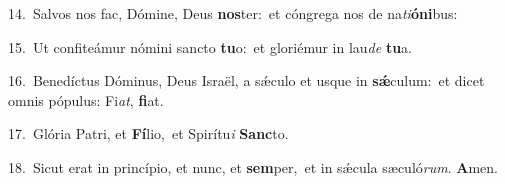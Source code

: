 {\numbfont\textcolor{\numbcolor}{14.}}~Salvos nos fac, Dómine, Deus \textbf{nos}\-ter:~\star et cóngrega nos de na\-\textit{ti}\-\textbf{ó}\textbf{ni}bus:\par
{\numbfont\textcolor{\numbcolor}{15.}}~Ut confiteámur nómini sancto \textbf{tu}\-o:~\star et gloriémur in lau\textit{de} \textbf{tu}\-a.\par
{\numbfont\textcolor{\numbcolor}{16.}}~Benedíctus Dóminus, Deus Israël, a sǽculo et usque in \textbf{sǽ}\-culum:~\star et dicet omnis pópulus: Fi\-\textit{at}\-, \textbf{fi}\-at.\par
{\numbfont\textcolor{\numbcolor}{17.}}~Glória Patri, et \textbf{Fí}\-lio,~\star et Spirítu\textit{i} \textbf{Sanc}\-to.\par
{\numbfont\textcolor{\numbcolor}{18.}}~Sicut erat in princípio, et nunc, et \textbf{sem}\-per,~\star et in sǽcula sæculó\-\textit{rum}\-. \textbf{A}\-men.\par
